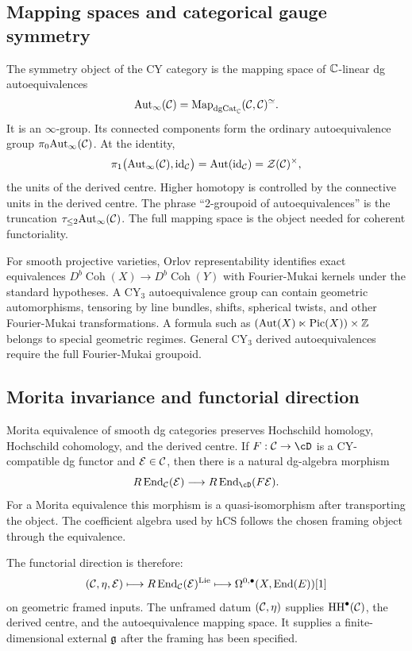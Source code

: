 \subsection*{Mapping spaces and categorical gauge symmetry}

The symmetry object of the CY category is the mapping space of
\(\mathbb{C}\)-linear dg autoequivalences
\[
  \mathrm{Aut}_{\infty}(\mathcal{C})
  =
  \operatorname{Map}_{\mathrm{dgCat}_{\mathbb{C}}}(\mathcal{C},\mathcal{C})^{\simeq}.
\]
It is an \(\infty\)-group. Its connected components form the ordinary
autoequivalence group \(\pi_0\mathrm{Aut}_{\infty}(\mathcal{C})\). At the identity,
\[
  \pi_1\bigl(\mathrm{Aut}_{\infty}(\mathcal{C}),\operatorname{id}_{\mathcal{C}}\bigr)
  =
  \mathrm{Aut}(\operatorname{id}_{\mathcal{C}})
  =
  \mathcal{Z}(\mathcal{C})^\times ,
\]
the units of the derived centre. Higher homotopy is controlled by the
connective units in the derived centre. The phrase ``2-groupoid of
autoequivalences'' is the truncation \(\tau_{\leq 2}\mathrm{Aut}_{\infty}(\mathcal{C})\).
The full mapping space is the object needed for coherent functoriality.

For smooth projective varieties, Orlov representability identifies
exact equivalences \(D^b\operatorname{Coh}(X)\to D^b\operatorname{Coh}(Y)\)
with Fourier-Mukai kernels under the standard hypotheses. A CY$_3$
autoequivalence group can contain geometric automorphisms, tensoring by
line bundles, shifts, spherical twists, and other Fourier-Mukai
transformations. A formula such as
\((\mathrm{Aut}(X)\ltimes\operatorname{Pic}(X))\times\mathbb{Z}\) belongs to special
geometric regimes. General CY$_3$ derived autoequivalences require the
full Fourier-Mukai groupoid.

\subsection*{Morita invariance and functorial direction}

Morita equivalence of smooth dg categories preserves Hochschild
homology, Hochschild cohomology, and the derived centre. If
\(F:\cC\to\cD\) is a CY-compatible dg functor and \(\mathcal{E}\in\mathcal{C}\), then
there is a natural dg-algebra morphism
\[
  \REnd_{\cC}(\cE)
  \longrightarrow
  \REnd_{\cD}(F\cE).
\]
For a Morita equivalence this morphism is a quasi-isomorphism after
transporting the object. The coefficient algebra used by hCS follows
the chosen framing object through the equivalence.

The functorial direction is therefore:
\[
  (\mathcal{C},\eta,\mathcal{E})
  \longmapsto
  R\operatorname{End}_{\mathcal{C}}(\mathcal{E})^{\mathrm{Lie}}
  \longmapsto
  \Omega^{0,\bullet}(X,\operatorname{End}(E))[1]
\]
on geometric framed inputs. The unframed datum \((\mathcal{C},\eta)\) supplies
\(\operatorname{HH}^\bullet(\mathcal{C})\), the derived centre, and the autoequivalence
mapping space. It supplies a finite-dimensional external \(\mathfrak{g}\) after
the framing has been specified.

